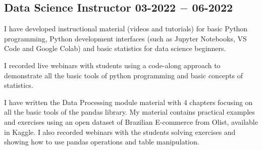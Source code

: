 \subsection{{Data Science Instructor \hfill 03-2022 $-$ 06-2022}}
\begin{zitemize}
\item I have developed instructional material (videos and tutorials) for basic Python programming, Python development interfaces (such as Jupyter Notebooks, VS Code and Google Colab) 
and basic statistics for data science beginners.
\item I recorded live webinars with students using a code-along approach to demonstrate all the basic tools of python programming and basic concepts of statistics.
\item I have written the Data Processing module material with 4 chapters focusing on all the basic tools of the pandas library. My material contains practical examples 
and exercises using an open dataset of Brazilian E-commerce from Olist, available in Kaggle. I also recorded webinars with the students solving exercises 
and showing how to use pandas operations and table manipulation.
\end{zitemize}

